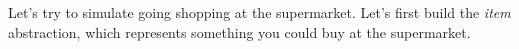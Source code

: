 Let's try to simulate going shopping at the supermarket.
Let's first build the \emph{item} abstraction,
which represents something you could buy at the supermarket.
